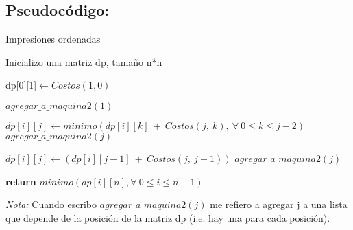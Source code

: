 \subsection{Pseudocódigo:}

\begin{algorithm}
\caption{Impresiones ordenadas}\label{ej1}
\begin{algorithmic}[1]
	\State Inicializo una matriz dp, tamaño n*n
	
	\State dp[0][1]$\gets Costos(1,0)$ 
	
	\State $agregar\_a\_maquina2(1)$ 
	
	 
				\State $dp[i][j]\gets minimo(dp[i][k]\ +\ Costos(j,\ k),\ \forall\ 0\leq k\leq j-2) $
				\State $agregar\_a\_maquina2(j)$
				
			\Else
				\State $dp[i][j]\gets (dp[i][j-1]\ +\ Costos(j,\ j-1))$
				\State $agregar\_a\_maquina2(j)$
			\EndIf
		\EndFor
	\EndFor
	
	\State \textbf{return} $minimo(dp[i][n], \forall\ 0\leq i\leq n-1)$ 
	\State {}
\EndProcedure
\end{algorithmic}
\end{algorithm}

\textit{Nota:} Cuando escribo $agregar\_a\_maquina2(j)$ me refiero a agregar j a una lista que depende de la posición de la matriz dp (i.e. hay una para cada posición).\\